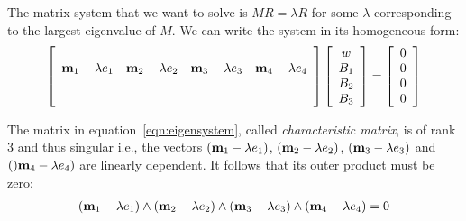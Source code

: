 \documentclass{birkjour}
\numberwithin{equation}{section}
\begin{document}
The matrix system that we want to solve is $M R = \lambda R$ for some $\lambda$ corresponding to the largest eigenvalue of $M$. We can write the system in its homogeneous form:
\begin{eqnarray}
	\label{eqn:eigensystem}
	\left[\begin{array}{cccc}
		\\
		\textbf m_1 - \lambda e_1 & \textbf m_2 - \lambda e_2 & \textbf m_3 - \lambda e_3 & \textbf m_4- \lambda e_4 \\
		\\
		\\
	\end{array}\right]
	\left[\begin{array}{c} 
		w \\
		B_1\\
		B_2\\
		B_3
	\end{array}\right] = 	
	\left[\begin{array}{c} 
		0 \\
		0 \\
		0 \\
		0
	\end{array}\right]
\end{eqnarray}

The matrix in equation~\ref{eqn:eigensystem}, called \emph{characteristic matrix}, is of rank $3$ and thus singular i.e., the vectors $(\textbf m_1 - \lambda e_1)$, $(\textbf m_2 - \lambda e_2)$, $(\textbf m_3 - \lambda e_3)$ and $()\textbf m_4- \lambda e_4)$ are linearly dependent. It follows that its outer product must be zero:
\begin{eqnarray}
\label{eqn:characteristic_outer_product}
(\textbf m_1 - \lambda e_1)\wedge(\textbf m_2 - \lambda e_2)\wedge(\textbf m_3 - \lambda e_3)\wedge(\textbf m_4- \lambda e_4) = 0
\end{eqnarray}
\end{document}

